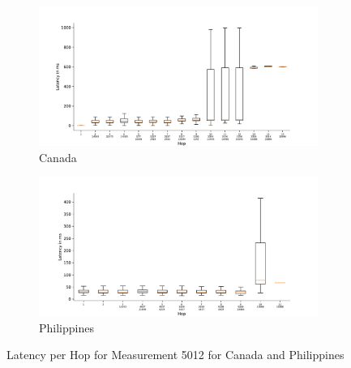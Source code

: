 \begin{figure}
	\centering
	\begin{subfigure}[b]{\linewidth}
		\includegraphics[width=\linewidth]{chapters/4-results/traceroute/img/latency-per-hop-CA-5012.pdf}
		\caption{Canada}
	\end{subfigure}
	\begin{subfigure}[b]{\linewidth}
		\includegraphics[width=\linewidth]{chapters/4-results/traceroute/img/latency-per-hop-PH-5012.pdf}
		\caption{Philippines}
	\end{subfigure}
	\caption{Latency per Hop for Measurement 5012 for Canada and
		Philippines}
	\label{fig:latency-change-per-hop-appendix-11}
\end{figure}

